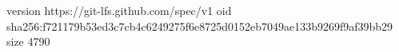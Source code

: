 version https://git-lfs.github.com/spec/v1
oid sha256:f721179b53ed3c7cb4c6249275f6e8725d0152eb7049ae133b9269f9af39bb29
size 4790
